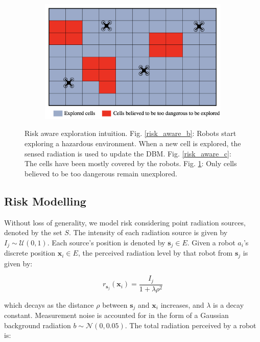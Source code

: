\documentclass[letterpaper, 10 pt, conference]{ieeeconf}
\begin{document}
\begin{figure}[h]
\begin{subfigure}{0.30\textwidth}
         \centering
         \includegraphics[width=\textwidth]{images/risk_aware_d.png}
         \caption{}
         \label{risk_aware_d}
    \end{subfigure}
        \caption{Risk aware exploration intuition. Fig. \ref{risk_aware_b}: Robots start exploring a hazardous environment. When a new cell is explored, the sensed radiation is used to update the DBM. Fig. \ref{risk_aware_c}: The cells have been mostly covered by the robots. Fig. \ref{risk_aware_d}: Only cells believed to be too dangerous remain unexplored.}
    \label{risk_aware}
\end{figure}


\subsection{Risk Modelling}
Without loss of generality, we model risk considering point radiation
sources, denoted by the set $S$. The intensity of each radiation
source is given by $I_j\sim\mathcal{U}(0, 1)$. Each source's position
is denoted by $\bm{s}_j \in E$. Given a robot $a_i$'s discrete
position $\bm{x}_i \in E$, the perceived radiation level by that robot
from $\bm{s}_j$ is given by:

\begin{equation}
    r_{\bm{s}_j}(\bm{x}_i) = \frac{I_j}{1 + \lambda\rho^2}
    \label{eq:radiation}
\end{equation}

which decays as the distance $\rho$ between $\bm{s}_j$ and $\bm{x}_i$
increases, and $\lambda$ is a decay constant. Measurement noise is
accounted for in the form of a Gaussian background radiation
$b \sim \mathcal{N}(0, 0.05)$. The total radiation perceived by a
robot is:
\end{document}
